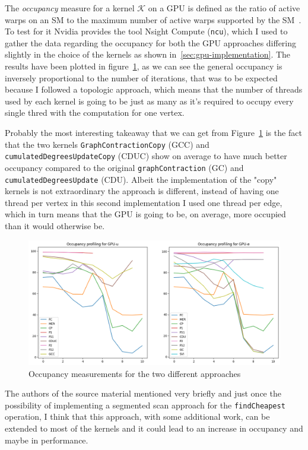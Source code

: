 \documentclass[a4paper,10pt]{article}
\begin{document}
The \emph{occupancy} measure for a kernel $\mathcal{K}$ on a GPU is defined as the ratio of active warps on an SM to the maximum number of active warps supported by the SM~\cite{def-occupancy}. To test for it Nvidia provides the tool Nsight Compute (\texttt{ncu}), which I used to gather the data regarding the occupancy for both the GPU approaches differing slightly in the choice of the kernels as shown in~\ref{sec:gpu-implementation}. The results have been plotted in figure~\ref{fig:occupancy}, as we can see the general occupancy is inversely proportional to the number of iterations, that was to be expected because I followed a topologic approach, which means that the number of threads used by each kernel is going to be just as many as it's required to occupy every single thred with the computation for one vertex.

Probably the most interesting takeaway that we can get from Figure~\ref{fig:occupancy} is the fact that the two kernels \texttt{GraphContractionCopy} (GCC) and \texttt{cumulatedDegreesUpdateCopy} (CDUC) show on average to have much better occupancy compared to the original \texttt{graphContraction} (GC) and \texttt{cumulatedDegreesUpdate} (CDU). Albeit the implementation of the "copy" kernels is not extraordinary the approach is different, instead of having one thread per vertex in this second implementation I used one thread per edge, which in turn means that the GPU is going to be, on average, more occupied than it would otherwise be.

\begin{figure}[!h]
	\centering
	\includegraphics[scale=0.5]{fig/occupancy.png}
	\caption{Occupancy measurements for the two different approaches}
	\label{fig:occupancy}
\end{figure}

The authors of the source material mentioned very briefly and just once the possibility of implementing a segmented scan approach for the \texttt{findCheapest} operation, I think that this approach, with some additional work, can be extended to most of the kernels and it could lead to an increase in occupancy and maybe in performance.
\end{document}
